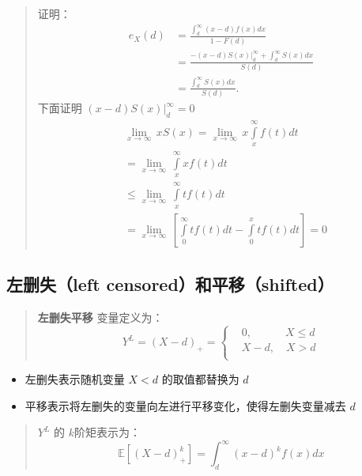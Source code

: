 \documentclass[
]{book}
\begin{document}
\begin{quote}
证明：
\[
\begin{align*}
{{e}_{X}}(d)&=\frac{\int_{d}^{\infty }{(x-d)f(x)dx}}{1-F(d)}\\
&=\frac{-(x-d)S(x)|_{d}^{\infty }+\int_{d}^{\infty }{S(x)dx}}{S(d)}\\
&=\frac{\int_{d}^{\infty }{S(x)dx}}{S(d)}.
\end{align*}
\]
下面证明 \((x-d)S(x)|_{d}^{\infty }=0\)
\[
\begin{align*}
& \underset{x\to \infty }{\mathop{\lim }}\,xS(x)=\underset{x\to \infty }{\mathop{\lim }}\,x\int\limits_{x}^{\infty }{f(t)dt} \\ 
& =\underset{x\to \infty }{\mathop{\lim }}\,\int\limits_{x}^{\infty }{xf(t)dt} \\ 
& \le \underset{x\to \infty }{\mathop{\lim }}\,\int\limits_{x}^{\infty }{tf(t)dt} \\ 
& =\underset{x\to \infty }{\mathop{\lim }}\,\left[ \int\limits_{0}^{\infty }{tf(t)dt}-\int\limits_{0}^{x}{tf(t)dt} \right]=0
\end{align*}
\]
\end{quote}

\hypertarget{ux5de6ux5220ux5931left-censoredux548cux5e73ux79fbshifted}{%
\subsection{左删失（left censored）和平移（shifted）}\label{ux5de6ux5220ux5931left-censoredux548cux5e73ux79fbshifted}}

\begin{quote}
\textbf{左删失平移} 变量定义为：
\[
{{Y}^{L}}={{\left( X-d \right)}_{+}}= 
\begin{cases}
& 0,\quad \quad \quad X\le d \\ 
& X-d,\quad X>d \\ 
\end{cases} 
\]
\end{quote}

\begin{itemize}
\item
  左删失表示随机变量 \(X<d\) 的取值都替换为 \(d\)
\item
  平移表示将左删失的变量向左进行平移变化，使得左删失变量减去 \(d\)
\end{itemize}

\begin{quote}
\({Y}^{L}\) 的 \(k\)阶矩表示为：
\[
\mathbb{E}[(X-d)_{+}^k]={\int_{d}^{\infty}(x-d)^kf(x)dx}
\]
\end{quote}
\end{document}

